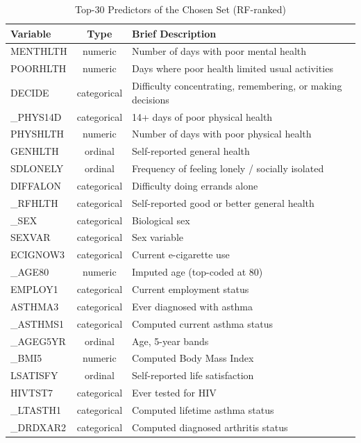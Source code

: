 \documentclass[conference]{IEEEtran}
\begin{document}
\begin{table}[htbp]
\caption{Top-30 Predictors of the Chosen Set (RF-ranked)}
\begin{center}
\scriptsize
\setlength{\tabcolsep}{3pt}
\renewcommand{\arraystretch}{1.15}
\begin{tabular}{|l|c|p{4.0cm}|}
\hline
\textbf{Variable} & \textbf{Type} & \textbf{Brief Description} \\
\hline
MENTHLTH   & numeric     & Number of days with poor mental health \\
POORHLTH   & numeric     & Days where poor health limited usual activities \\
DECIDE     & categorical & Difficulty concentrating, remembering, or making decisions \\
\_PHYS14D  & categorical & 14+ days of poor physical health \\
PHYSHLTH   & numeric     & Number of days with poor physical health \\
GENHLTH    & ordinal     & Self-reported general health \\
SDLONELY   & ordinal     & Frequency of feeling lonely / socially isolated \\
DIFFALON   & categorical & Difficulty doing errands alone \\
\_RFHLTH   & categorical & Self-reported good or better general health \\
\_SEX      & categorical & Biological sex \\
SEXVAR     & categorical & Sex variable \\
ECIGNOW3   & categorical & Current e-cigarette use \\
\_AGE80    & numeric     & Imputed age (top-coded at 80) \\
EMPLOY1    & categorical & Current employment status \\
ASTHMA3    & categorical & Ever diagnosed with asthma \\
\_ASTHMS1  & categorical & Computed current asthma status \\
\_AGEG5YR  & ordinal     & Age, 5-year bands \\
\_BMI5     & numeric     & Computed Body Mass Index \\
LSATISFY   & ordinal     & Self-reported life satisfaction \\
HIVTST7    & categorical & Ever tested for HIV \\
\_LTASTH1  & categorical & Computed lifetime asthma status \\
\_DRDXAR2  & categorical & Computed diagnosed arthritis status \\

\end{tabular}
\end{center}
\end{table}
\end{document}
